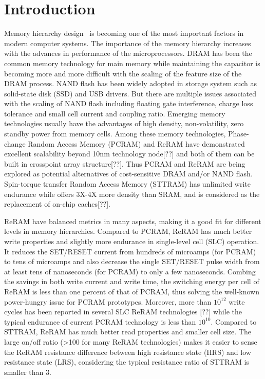 \section{Introduction} \label{sec:introduction}

Memory hierarchy design~\cite{CACTI51} is becoming one of the most important factors in modern computer systems. The importance of the memory hierarchy increases with the advances in performance of the microprocessors. DRAM has been the common memory technology for main memory while maintaining the capacitor is becoming more and more difficult with the scaling of the feature size of the DRAM process. NAND flash has been widely adopted in storage system such as solid-state disk (SSD) and USB drivers. But there are multiple issues associated with the scaling of NAND flash including floating gate interference, charge loss tolerance and small cell current and coupling ratio. Emerging memory technologies usually have the advantages of high density, non-volatility, zero standby power from memory cells. Among these memory technologies, Phase-change Random Access Memory (PCRAM) and ReRAM have demonstrated excellent scalability beyond 10nm technology node[??] and both of them can be built in crosspoint array structure[??]. Thus PCRAM and ReRAM are being explored as potential alternatives of cost-sensitive DRAM and/or NAND flash. Spin-torque transfer Random Access Memory (STTRAM) has unlimited write endurance while offers 3X-4X more density than SRAM, and is considered as the replacement of on-chip caches[??].

ReRAM have balanced metrics in many aspects, making it a good fit for different levels in memory hierarchies. Compared to PCRAM, ReRAM has much better write properties and slightly more endurance in single-level cell (SLC) operation. It reduces the SET/RESET current from hundreds of microamps (for PCRAM) to tens of microamps and also decrease the single SET/RESET pulse width from at least tens of nanoseconds (for PCRAM) to only a few nanoseconds. Combing the savings in both write current and write time, the switching energy per cell of ReRAM is less than one percent of that of PCRAM, thus solving the well-known power-hungry issue for PCRAM prototypes. Moreover, more than $10^{12}$ write cycles has been reported in several SLC ReRAM technologies [??] while the typical endurance of current PCRAM technology is less than $10^{10}$. Compared to STTRAM, ReRAM has much better read properties and smaller cell size. The large on/off ratio (>100 for many ReRAM technologies) makes it easier to sense the ReRAM resistance difference between high resistance state (HRS) and low resistance state (LRS), considering the typical resistance ratio of STTRAM is smaller than 3.


